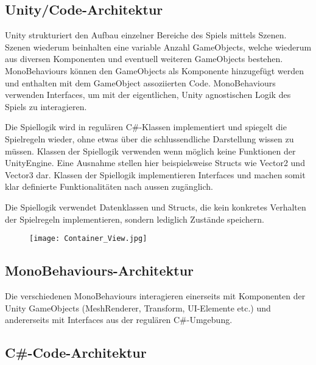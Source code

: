 \documentclass[../main.tex]{subfiles}
\begin{document}
	\subsection{Unity/Code-Architektur}
	\label{section:UnityCodeArchitektur}
	\par Unity strukturiert den Aufbau einzelner Bereiche des Spiels mittels Szenen. Szenen wiederum beinhalten eine variable Anzahl GameObjects, welche wiederum aus diversen Komponenten und eventuell weiteren GameObjects bestehen. MonoBehaviours können den GameObjects als Komponente hinzugefügt werden und enthalten mit dem GameObject assoziierten Code. MonoBehaviours verwenden Interfaces, um mit der eigentlichen, Unity agnostischen Logik des Spiels zu interagieren.
	\par Die Spiellogik wird in regulären C\#-Klassen implementiert und spiegelt die Spielregeln wieder, ohne etwas über die schlussendliche Darstellung wissen zu müssen. Klassen der Spiellogik verwenden wenn möglich keine Funktionen der UnityEngine. Eine Ausnahme stellen hier beispielsweise Structs wie Vector2 und Vector3 dar. Klassen der Spiellogik implementieren Interfaces und machen somit klar definierte Funktionalitäten nach aussen zugänglich.
	\par Die Spiellogik verwendet Datenklassen und Structs, die kein konkretes Verhalten der Spielregeln implementieren, sondern lediglich Zustände speichern.
	\begin{figure}[H]
		\centering
		\texttt{[image: Container\_View.jpg]}
	\end{figure}
	
	\subsection{MonoBehaviours-Architektur}
	\par Die verschiedenen MonoBehaviours interagieren einerseits mit Komponenten der Unity GameObjects (MeshRenderer, Transform, UI-Elemente etc.) und andererseits mit Interfaces aus der regulären C\#-Umgebung.
	\subsection{C\#-Code-Architektur}
\end{document}
